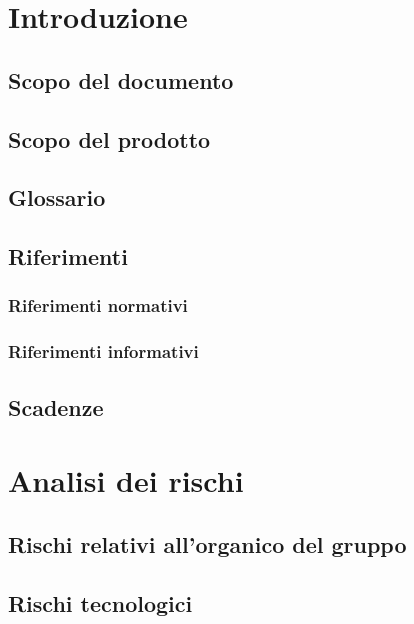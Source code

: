 \documentclass[a4paper, oneside, openany, dvipsnames, table]{article}
\begin{document}
\copertina{}


\newpage
\tableofcontents
\newpage

\section{Introduzione}
	\subsection{Scopo del documento}
		
	\subsection{Scopo del prodotto}
		
	\subsection{Glossario}
		
	\subsection{Riferimenti}
		\subsubsection{Riferimenti normativi}
			
		\subsubsection{Riferimenti informativi}
			
	\subsection{Scadenze}
		
\section{Analisi dei rischi}
	
	\subsection{Rischi relativi all'organico del gruppo}
		
	\subsection{Rischi tecnologici}
\end{document}
